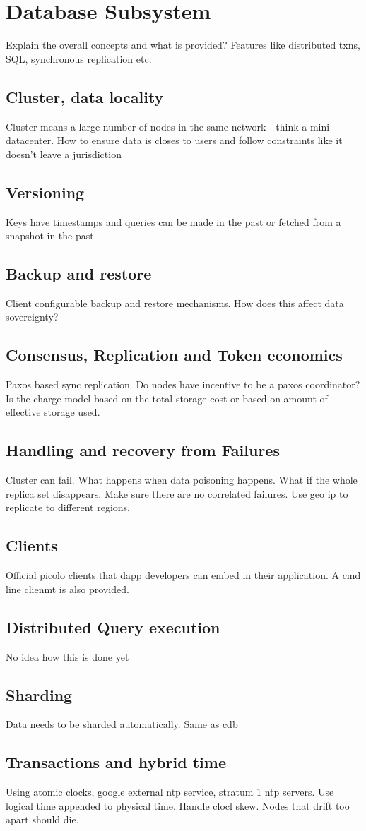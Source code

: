 \section{Database Subsystem}
Explain the overall concepts and what is provided? Features like distributed txns, SQL, synchronous replication etc.
\subsection{Cluster, data locality}
Cluster means a large number of nodes in the same network - think a mini datacenter. How to ensure data is closes to users and follow constraints like it doesn't leave a jurisdiction
\subsection{Versioning}
Keys have timestamps and queries can be made in the past or fetched from a snapshot in the past
\subsection{Backup  and restore}
Client configurable backup and restore mechanisms. How does this affect data sovereignty?
\subsection{Consensus, Replication and Token economics}
Paxos based sync replication. Do nodes have incentive to be a paxos coordinator? Is the charge model based on the total storage cost or based on amount of effective storage used.
\subsection{Handling and recovery from  Failures}
Cluster can fail. What happens when data poisoning happens. What if the whole replica set disappears. Make sure there are no correlated failures. Use geo ip to replicate to different regions.
\subsection{Clients}
Official picolo clients that dapp developers can embed in their application. A cmd line clienmt is also provided.
\subsection{Distributed Query execution}
No idea how this is done yet
\subsection{Sharding}
Data needs to be sharded automatically. Same as cdb
\subsection{Transactions and hybrid time}
Using atomic clocks, google external ntp service, stratum 1 ntp servers. Use logical time appended to physical time. Handle clocl skew. Nodes that drift too apart should die. 

